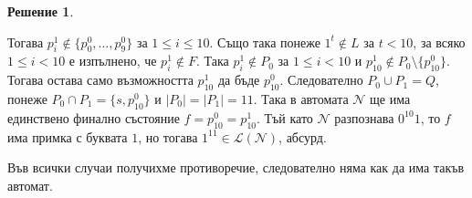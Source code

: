 \documentclass{article}
\newcommand{\N}{\mathcal{N}}
\newcommand{\calL}{\mathcal{L}}
\theoremstyle{definition}
\newtheorem*{solution}{Решение}
\begin{document}
\begin{solution}
\begin{enumerate}
\begin{itemize}
                        Тогава $p^1_i \notin \{ p^0_0, \dots, p^0_9 \}$ за $1 \leq i \leq 10$.
                        Също така понеже $1^t \notin L$ за $t < 10$, за всяко $1 \leq i < 10$ е изпълнено, че $p^1_i \notin F$.
                        Така $p^1_i \notin P_0$ за $1 \leq i < 10$ и $p^1_{10} \notin P_0 \setminus \{ p^0_{10} \}$.
                        Тогава остава само възможността $p^1_{10}$ да бъде $p^0_{10}$.
                        Следователно $P_0 \cup P_1 = Q$, понеже $P_0 \cap P_1 = \{ s, p^0_{10} \}$ и $|P_0| = |P_1| = 11$.
                        Така в автомата $\N$ ще има единствено финално състояние $f = p^0_{10} = p^1_{10}$.
                        Тъй като $\N$ разпознава $0^{10}1$, то $f$ има примка с буквата $1$, но тогава $1^{11} \in \calL(\N)$, абсурд.
              \end{itemize}
    \end{enumerate}
    Във всички случаи получихме противоречие, следователно няма как да има такъв автомат.
\end{solution}
\end{document}
